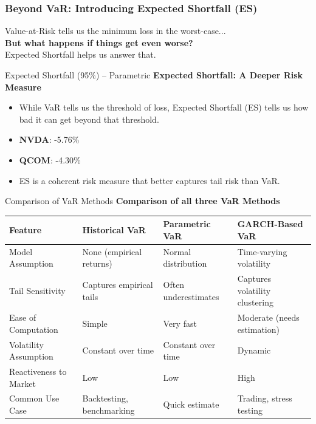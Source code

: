 \documentclass{beamer}[9pt]
\begin{document}
\begin{frame}
	\frametitle{Beyond VaR: Introducing Expected Shortfall (ES)}
	\centering
	\Large
	Value-at-Risk tells us the minimum loss in the worst-case...\\[1em]
	\textbf{But what happens if things get even worse?} \\[2em]
	\normalsize
	Expected Shortfall helps us answer that.
\end{frame}


\begin{frame}{Expected Shortfall (95\%) – Parametric}
	\textbf{Expected Shortfall: A Deeper Risk Measure}
	\begin{itemize}
		\item While VaR tells us the threshold of loss, Expected Shortfall (ES) tells us how bad it can get beyond that threshold.
		\item \textbf{NVDA}: -5.76\%
		\item \textbf{QCOM}: -4.30\%
		\item ES is a coherent risk measure that better captures tail risk than VaR.
	\end{itemize}
\end{frame}

\begin{frame}{Comparison of VaR Methods}
	\textbf{Comparison of all three VaR Methods}
	\tiny
	\renewcommand{\arraystretch}{1.4}  %
	\begin{tabularx}{\textwidth}{l|X|X|X}
		\toprule
		\textbf{Feature} & \textbf{Historical VaR} & \textbf{Parametric VaR} & \textbf{GARCH-Based VaR} \\
		\midrule
		Model Assumption & None (empirical returns) & Normal distribution & Time-varying volatility \\
		\midrule
		Tail Sensitivity & Captures empirical tails & Often underestimates & Captures volatility clustering \\
		\midrule
		Ease of Computation & Simple & Very fast & Moderate (needs estimation) \\
		\midrule
		Volatility Assumption & Constant over time & Constant over time & Dynamic \\
		\midrule
		Reactiveness to Market & Low & Low & High \\
		\midrule
		Common Use Case & Backtesting, benchmarking & Quick estimate & Trading, stress testing \\
		\bottomrule
	\end{tabularx}
\end{frame}
\end{document}
